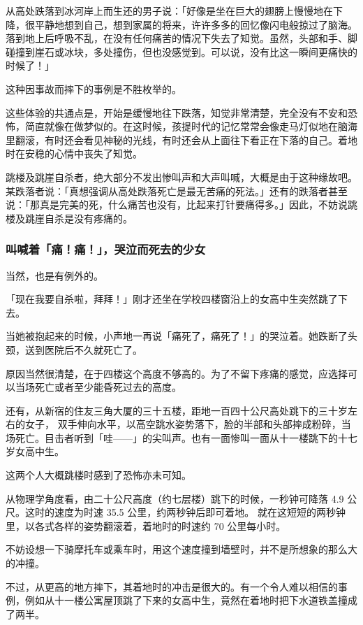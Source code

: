 \documentclass[UTF8]{ctexart}
\begin{document}
从高处跌落到冰河岸上而生还的男子说：「好像是坐在巨大的翅膀上慢慢地在下降，很平静地想到自己，想到家属的将来，许许多多的回忆像闪电般掠过了脑海。落到地上后呼吸不乱，在没有任何痛苦的情况下失去了知觉。虽然，头部和手、脚碰撞到崖石或冰块，多处撞伤，但也没感觉到。可以说，没有比这一瞬间更痛快的时候了！」

 这种因事故而摔下的事例是不胜枚举的。

这些体验的共通点是，开始是缓慢地往下跌落，知觉非常清楚，完全没有不安和恐怖，简直就像在做梦似的。在这时候，孩提时代的记忆常常会像走马灯似地在脑海里翻滚，有时还会看见神秘的光线，有时还会从上面往下看正在下落的自己。着地时在安稳的心情中丧失了知觉。

跳楼及跳崖自杀者，绝大部分不发出惨叫声和大声叫喊，大概是由于这种缘故吧。某跌落者说：「真想强调从高处跌落死亡是最无苦痛的死法。」还有的跌落者甚至说：「那真是完美的死，什么痛苦也没有，比起来打针要痛得多。」因此，不妨说跳楼及跳崖自杀是没有疼痛的。

\subsubsection*{叫喊着「痛！痛！」，哭泣而死去的少女}

当然，也是有例外的。

「现在我要自杀啦，拜拜！」刚才还坐在学校四楼窗沿上的女高中生突然跳了下去。

当她被抱起来的时候，小声地一再说「痛死了，痛死了！」的哭泣着。她跌断了头颈，送到医院后不久就死亡了。

原因当然很清楚，在于四楼这个高度不够高的。为了不留下疼痛的感觉，应选择可以当场死亡或者至少能昏死过去的高度。

还有，从新宿的住友三角大厦的三十五楼，距地一百四十公尺高处跳下的三十岁左右的女子， 双手伸向水平，以高空跳水姿势落下，脸的半部和头部摔成粉碎，当场死亡。目击者听到「哇——」的尖叫声。也有一面惨叫一面从十一楼跳下的十七岁女高中生。

这两个人大概跳楼时感到了恐怖亦未可知。 

从物理学角度看，由二十公尺高度（约七层楼）跳下的时候，一秒钟可降落 4.9 公尺。这时的速度为时速 35.5 公里，约两秒钟后即可着地。
就在这短短的两秒钟里，以各式各样的姿势翻滚着，着地时的时速约 70 公里每小时。

不妨设想一下骑摩托车或乘车时，用这个速度撞到墙壁时，并不是所想象的那么大的冲撞。

不过，从更高的地方摔下，其着地时的冲击是很大的。有一个令人难以相信的事例，例如从十一楼公寓屋顶跳了下来的女高中生，竟然在着地时把下水道铁盖撞成了两半。
\end{document}
